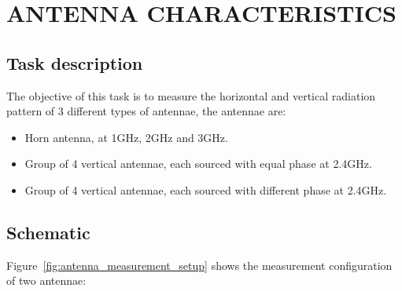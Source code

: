  \section{ANTENNA CHARACTERISTICS}
\subsection{Task description}
The objective of this task is to measure the horizontal and vertical radiation pattern of 3 different types of antennae, the antennae are:

\begin{itemize}
	\setlength{\itemsep}{0pt}
	\setlength{\parskip}{0pt}
	\item Horn antenna, at 1GHz, 2GHz and 3GHz.
	\item Group of 4 vertical antennae, each sourced with equal phase at 2.4GHz.
	\item Group of 4 vertical antennae, each sourced with different phase at 2.4GHz.
\end{itemize}

\subsection{Schematic}
Figure~\ref{fig:antenna_measurement_setup} shows the measurement configuration of two antennae:

